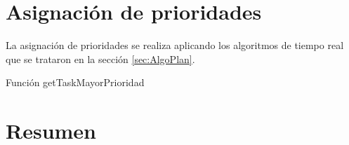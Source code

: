 \section{Asignación de prioridades} \label{secc:asigPrioridad}

La asignación de prioridades se realiza aplicando los algoritmos de tiempo real que se trataron en la sección \ref{sec:AlgoPlan}.

Función getTaskMayorPrioridad



\section{Resumen}




